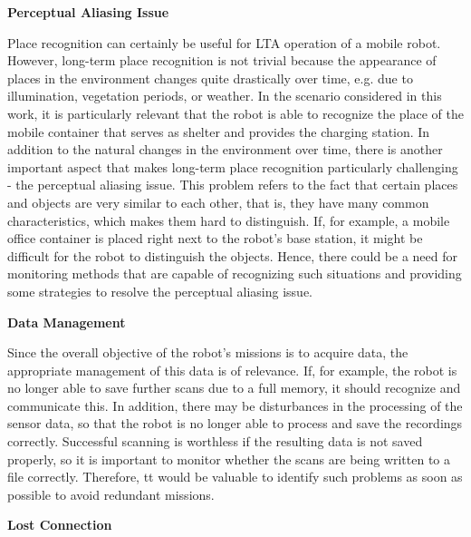 \documentclass[english, master, utf8]{base/thesis_KBS}
\begin{document}
\noindent
\textbf{Perceptual Aliasing Issue}\newline

\noindent
Place recognition can certainly be useful for LTA operation of a mobile robot. However, long-term place recognition is not trivial because 
the appearance of places in the environment changes quite drastically over time, e.g. due to illumination, vegetation periods, or weather. \cite{Han:2018}
In the scenario considered in this work, it is particularly relevant that the robot is able to recognize the place of the mobile container
that serves as shelter and provides the charging station. In addition to the natural changes in the environment over time, there is another important aspect
that makes long-term place recognition particularly challenging - the perceptual aliasing issue. This problem refers to the fact that certain places and objects are very 
similar to each other, that is, they have many common characteristics, which makes them hard to distinguish. \cite{Han:2018}
If, for example, a mobile office container is placed right next to the robot's base station, it might be difficult for the robot to distinguish the objects.
Hence, there could be a need for monitoring methods that are capable of recognizing such situations and providing some strategies to resolve the perceptual aliasing issue.\newline

\noindent
\textbf{Data Management}\newline

\noindent
Since the overall objective of the robot's missions is to acquire data, the appropriate management of this data is of relevance.
If, for example, the robot is no longer able to save further scans due to a full memory, it should recognize and communicate this.
In addition, there may be disturbances in the processing of the sensor data, so that the robot is no longer able to process and save the recordings correctly.
Successful scanning is worthless if the resulting data is not saved properly, so it is important to monitor whether the scans are being written to a file correctly.
Therefore, tt would be valuable to identify such problems as soon as possible to avoid redundant missions.\newline

\noindent
\textbf{Lost Connection}\newline
\end{document}
